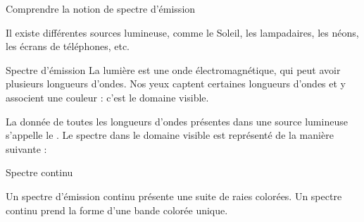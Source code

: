 \teteSndLumi

\vspace*{-36pt}


\begin{objectifs}
  \item Comprendre la notion de spectre d'émission
\end{objectifs}

\begin{contexte}
  Il existe différentes sources lumineuse, comme le Soleil, les lampadaires, les néons, les écrans de téléphones, etc.
  
\end{contexte}

\vspace*{-12pt}
\vspace*{-12pt}


\begin{doc}{Spectre d'émission}
  La lumière est une onde électromagnétique, qui peut avoir plusieurs longueurs d'ondes.
  Nos yeux captent certaines longueurs d'ondes et y associent une couleur : c'est le domaine visible.
  
  \begin{encart}
    La donnée de toutes les longueurs d'ondes présentes dans une source lumineuse s'appelle le .
    Le spectre dans le domaine visible est représenté de la manière suivante :
  \end{encart}
  \vspace{-22pt}
  \begin{center}
  \end{center}
\end{doc}

\vspace*{-12pt}
\vspace*{-12pt}

\begin{doc}{Spectre continu}
  \vspace*{-24pt}
  \begin{encart}
    Un spectre d'émission continu présente une suite de raies colorées.
    Un spectre continu prend la forme d'une bande colorée unique.
  \end{encart}
\end{doc}
  
